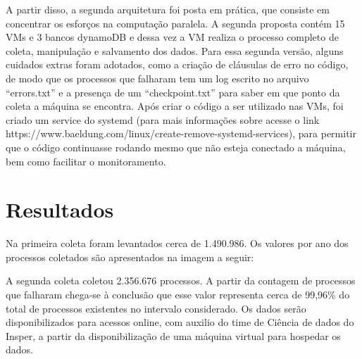 A partir disso, a segunda arquitetura foi posta em prática, que consiste em concentrar os esforços na computação paralela. A segunda proposta contém 15 VMs e 3 bancos dynamoDB e dessa vez a VM realiza o processo completo de coleta, manipulação e salvamento dos dados. Para essa segunda versão, alguns cuidados extras foram adotados, como a criação de cláusulas de erro no código, de modo que os processos que falharam tem um log escrito no arquivo “errors.txt” e a presença de um “checkpoint.txt” para saber em que ponto da coleta a máquina se encontra. Após criar o código a ser utilizado nas VMs, foi criado um service do systemd (para mais informações sobre acesse o link https://www.baeldung.com/linux/create-remove-systemd-services), para permitir que o código continuasse rodando mesmo que não esteja conectado a máquina, bem como facilitar o monitoramento. 
	
\section{Resultados}

	Na primeira coleta foram levantados cerca de 1.490.986. Os valores por ano dos processos coletados são apresentados na imagem a seguir:

	A segunda coleta coletou 2.356.676 processos. A partir da contagem de processos que falharam chega-se à conclusão que esse valor representa cerca de 99,96\% do total de processos existentes no intervalo considerado. Os dados serão disponibilizados para acessos online, com auxilio do time de Ciência de dados do Insper, a partir da disponibilização de uma máquina virtual para hospedar os dados.  



